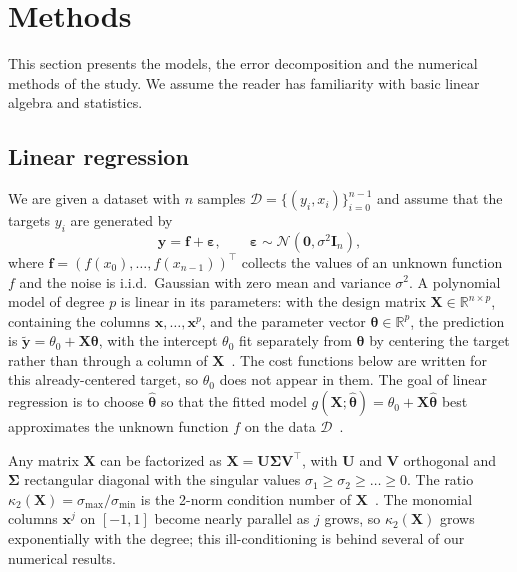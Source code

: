 \section{Methods}
\label{sec:method}

This section presents the models, the error decomposition and the numerical
methods of the study. We assume the reader has
familiarity with basic linear algebra and statistics.

\subsection{Linear regression}
\label{subsec:linear-regression}

We are given a dataset with $n$ samples $\mathcal{D} = \{(y_i, x_i)\}_{i=0}^{n-1}$
and assume that the targets $y_i$ are generated by
\begin{equation}\label{eq:data_generating_process}
    \bm{y} = \bm{f} + \bm{\varepsilon}, \qquad
    \bm{\varepsilon} \sim \mathcal{N}(\bm{0}, \sigma^2\bm{I}_n),
\end{equation}
where $\bm{f} = (f(x_0), \dots, f(x_{n-1}))^\top$ collects the values of an
unknown function $f$ and the noise is i.i.d.\ Gaussian with zero mean and variance
$\sigma^2$. A polynomial model of degree $p$ is linear in its parameters: with
the design matrix $\bm{X} \in \mathbb{R}^{n\times p}$, containing the columns
$\bm{x}, \dots, \bm{x}^p$, and the parameter vector $\bm{\theta}\in\mathbb{R}^{p}$, the
prediction is $\tilde{\bm{y}} = \theta_0 + \bm{X}\bm{\theta}$, with the
intercept $\theta_0$ fit separately from $\bm\theta$ by centering the target
rather than through a column of $\bm{X}$~\cite{hjorth-jensen_2026}.
The cost functions below are written for this already-centered target, so
$\theta_0$ does not appear in them. The goal of
linear regression is to choose $\hat{\bm{\theta}}$ so that the fitted model
$g(\bm{X}; \hat{\bm{\theta}}) = \theta_0 + \bm{X}\hat{\bm{\theta}}$ best
approximates the unknown function $f$ on the data
$\mathcal{D}$~\cite{mehta_2019}.

Any matrix $\bm{X}$ can be factorized as
$\bm{X} = \bm{U}\bm{\Sigma}\bm{V}^\top$, with $\bm{U}$ and $\bm{V}$ orthogonal and
$\bm{\Sigma}$ rectangular diagonal with the singular values $\sigma_1 \geq \sigma_2 \geq \dots \geq 0$. The ratio $\kappa_2(\bm{X}) =
\sigma_{\max}/\sigma_{\min}$ is the 2-norm condition number of $\bm{X}$~\cite{hjorth-jensen_2026}.
The monomial columns $\bm{x}^j$ on $[-1,1]$ become nearly parallel as $j$ grows,
so $\kappa_2(\bm{X})$ grows exponentially with the degree; this ill-conditioning
is behind several of our numerical results.

